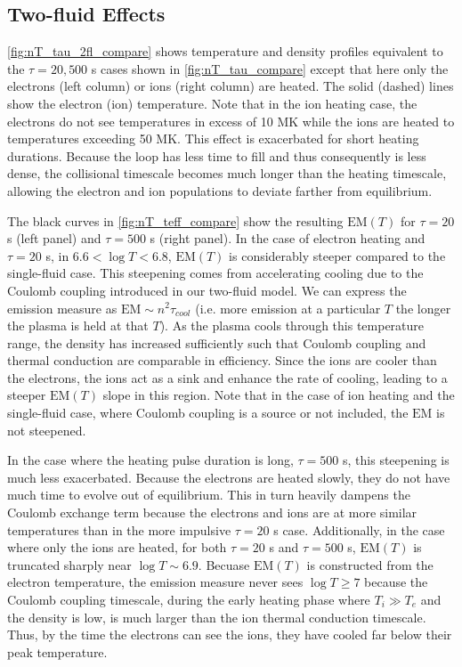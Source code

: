 \documentclass[apj]{emulateapj}
\begin{document}
	\subsection{Two-fluid Effects}
	\label{subsec:two_fluid_res}
	\par \autoref{fig:nT_tau_2fl_compare} shows temperature and density profiles equivalent to the $\tau=20,500$ s cases shown in \autoref{fig:nT_tau_compare} except that here only the electrons (left column) or ions (right column) are heated. The solid (dashed) lines show the electron (ion) temperature. Note that in the ion heating case, the electrons do not see temperatures in excess of 10 MK while the ions are heated to temperatures exceeding 50 MK. This effect is exacerbated for short heating durations. Because the loop has less time to fill and thus consequently is less dense, the collisional timescale becomes much longer than the heating timescale, allowing the electron and ion populations to deviate farther from equilibrium.
	\par The black curves in \autoref{fig:nT_teff_compare} show the resulting $\mathrm{EM}(T)$ for $\tau=20$ s (left panel) and $\tau=500$ s (right panel). In the case of electron heating and $\tau=20$ s, in $6.6<\log{T}<6.8$, $\mathrm{EM}(T)$ is considerably steeper compared to the single-fluid case. This steepening comes from accelerating cooling due to the Coulomb coupling introduced in our two-fluid model. We can express the emission measure as $\mathrm{EM}\sim n^2\tau_{cool}$ (i.e. more emission at a particular $T$ the longer the plasma is held at that $T$). As the plasma cools through this temperature range, the density has increased sufficiently such that Coulomb coupling and thermal conduction are comparable in efficiency. Since the ions are cooler than the electrons, the ions act as a sink and enhance the rate of cooling, leading to a steeper $\mathrm{EM}(T)$ slope in this region. Note that in the case of ion heating and the single-fluid case, where Coulomb coupling is a source or not included, the $\mathrm{EM}$ is not steepened. 
	\par In the case where the heating pulse duration is long, $\tau=500$ s, this steepening is much less exacerbated. Because the electrons are heated slowly, they do not have much time to evolve out of equilibrium. This in turn heavily dampens the Coulomb exchange term because the electrons and ions are at more similar temperatures than in the more impulsive $\tau=20$ s case. Additionally, in the case where only the ions are heated, for both $\tau=20$ s and $\tau=500$ s, $\mathrm{EM}(T)$ is truncated sharply near $\log{T}\sim6.9$. Becuase $\mathrm{EM}(T)$ is constructed from the electron temperature, the emission measure never sees $\log{T}\ge7$ because the Coulomb coupling timescale, during the early heating phase where $T_i\gg T_e$ and the density is low, is much larger than the ion thermal conduction timescale. Thus, by the time the electrons can see the ions, they have cooled far below their peak temperature.
\end{document}
